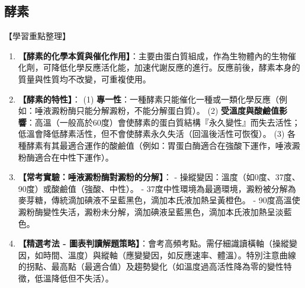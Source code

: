 \documentclass[11pt,a4paper]{article}
\begin{document}
\subsection{酵素}
\begin{learningpoints}{【學習重點整理】}
\begin{enumerate}[label=\arabic*.]
  \item \textbf{【酵素的化學本質與催化作用】}：主要由蛋白質組成，作為生物體內的生物催化劑，可降低化學反應活化能，加速代謝反應的進行。反應前後，酵素本身的質量與性質均不改變，可重複使用。
  \item \textbf{【酵素的特性】}：
  (1) \textbf{專一性}：一種酵素只能催化一種或一類化學反應（例如：唾液澱粉酶只能分解澱粉，不能分解蛋白質）。
  (2) \textbf{受溫度與酸鹼值影響}：高溫（一般高於60度）會使酵素的蛋白質結構『永久變性』而失去活性；低溫會降低酵素活性，但不會使酵素永久失活（回溫後活性可恢復）。
  (3) 各種酵素有其最適合運作的酸鹼值（例如：胃蛋白酶適合在強酸下運作，唾液澱粉酶適合在中性下運作）。
  \item \textbf{【常考實驗：唾液澱粉酶對澱粉的分解】}：
  - 操縱變因：溫度（如0度、37度、90度）或酸鹼值（強酸、中性）。
  - 37度中性環境為最適環境，澱粉被分解為麥芽糖，傳統滴加碘液不呈藍黑色，滴加本氏液加熱呈黃橙色。
  - 90度高溫使澱粉酶變性失活，澱粉未分解，滴加碘液呈藍黑色，滴加本氏液加熱呈淡藍色。
  \item \textbf{【精選考法 - 圖表判讀解題策略】}：會考高頻考點。需仔細識讀橫軸（操縱變因，如時間、溫度）與縱軸（應變變因，如反應速率、體溫）。特別注意曲線的拐點、最高點（最適合值）及趨勢變化（如溫度過高活性降為零的變性特徵，低溫降低但不失活）。
\end{enumerate}
\end{learningpoints}
\end{document}
